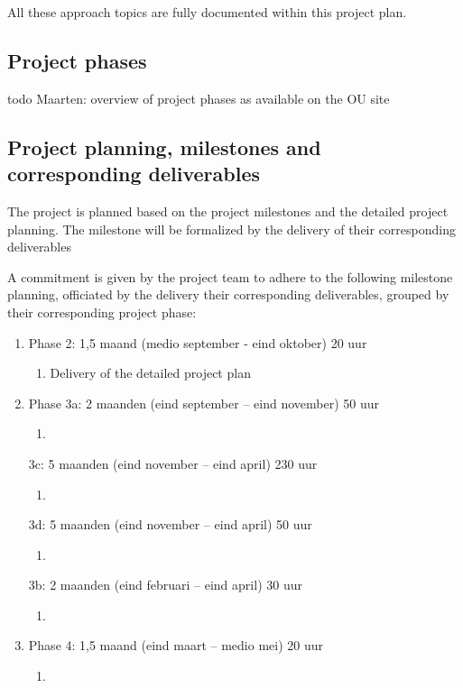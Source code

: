 All these approach topics are fully documented within this project plan.


\subsection{Project phases}
todo Maarten: overview of project phases as available on the OU site

\subsection{Project planning, milestones and corresponding deliverables }
The project is planned based on the project milestones and the detailed project planning. The milestone will be formalized by the delivery of their corresponding deliverables

A commitment is given by the project team to adhere to the following milestone planning, officiated by the delivery their corresponding deliverables, grouped by their corresponding project phase:

 \begin{enumerate}
	\item Phase 2: 1,5 maand (medio september - eind oktober)          20 uur
 	\begin{enumerate}
		\item Delivery of the detailed project plan
	\end {enumerate}
	\item Phase 3a: 2 maanden (eind september – eind november)       50 uur
 	\begin{enumerate}
		\item
	\end {enumerate}
 	\itemPhase 3c: 5 maanden (eind november – eind april)                230 uur
 	\begin{enumerate}
		\item
	\end {enumerate}
 	\itemPhase 3d: 5 maanden (eind november – eind april)                50 uur
 	\begin{enumerate}
		\item
	\end {enumerate}
 	\itemPhase 3b: 2 maanden (eind februari – eind april)                   30 uur
 	\begin{enumerate}
		\item
	\end {enumerate}
	\item Phase 4: 1,5 maand (eind maart – medio mei)                      20 uur
 	\begin{enumerate}
		\item
	\end {enumerate}
\end {enumerate}

